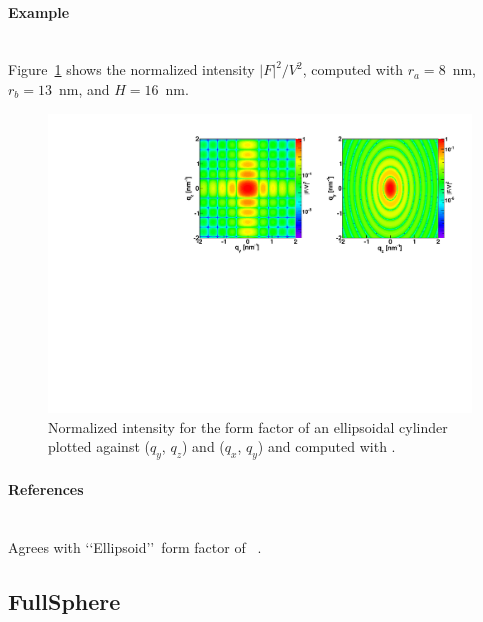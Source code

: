 \paragraph{Example}\strut\\
Figure~\ref{fig:FFellipscylinderEx} shows the normalized intensity
$|F|^2/V^2$, computed with $r_a=8$~nm, $r_b=13$~nm, and $H=16$~nm.
\begin{figure}[h]
\begin{center}
\includegraphics[angle=-90,width=\textwidth]{fig/ff/figffellipscylinder.pdf}
\end{center}
\caption{Normalized intensity for the form factor of an ellipsoidal
  cylinder plotted against ($q_y$, $q_z$) and ($q_x$,
  $q_y$) and computed with .}
\label{fig:FFellipscylinderEx}
\end{figure}

\paragraph{References}\strut\\
Agrees with \lq\lq Ellipsoid\rq\rq\ form factor of \IsGISAXS~\cite{Laz02}.

\clearpage
\subsection{FullSphere} \label{sec:FullSphere}

